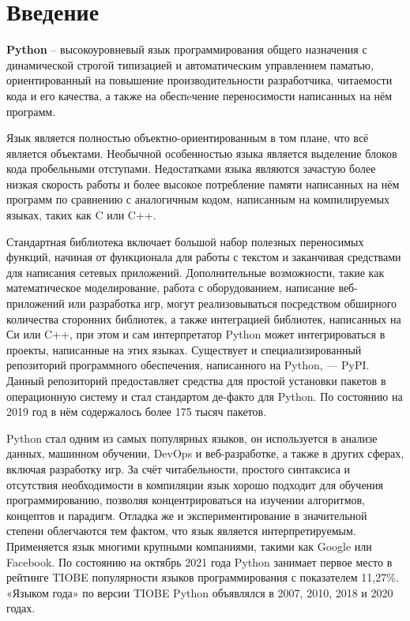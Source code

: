 \section{Введение}

\textbf{Python} -- высокоуровневый язык программирования общего назначения с динамической строгой типизацией и автоматическим управлением паматью, ориентированный на повышение производительности разработчика, читаемости кода и его качества, а также на обеспeчение переносимости написанных на нём программ.

Язык является полностью объектно-ориентированным в том плане, что всё является объектами. Необычной особенностью языка является выделение блоков кода пробельными отступами.
Недостатками языка являются зачастую более низкая скорость работы и более высокое потребление памяти написанных на нём программ по сравнению с аналогичным кодом, написанным на компилируемых языках, таких как C или C++.

Стандартная библиотека включает большой набор полезных переносимых функций, начиная от функционала для работы с текстом и заканчивая средствами для написания сетевых приложений. Дополнительные возможности, такие как математическое моделирование, работа с оборудованием, написание веб-приложений или разработка игр, могут реализовываться посредством обширного количества сторонних библиотек, а также интеграцией библиотек, написанных на Си или C++, при этом и сам интерпретатор Python может интегрироваться в проекты, написанные на этих языках. Существует и специализированный репозиторий программного обеспечения, написанного на Python, — PyPI. Данный репозиторий предоставляет средства для простой установки пакетов в операционную систему и стал стандартом де-факто для Python. По состоянию на 2019 год в нём содержалось более 175 тысяч пакетов.

Python стал одним из самых популярных языков, он используется в анализе данных, машинном обучении, DevOps и веб-разработке, а также в других сферах, включая разработку игр. За счёт читабельности, простого синтаксиса и отсутствия необходимости в компиляции язык хорошо подходит для обучения программированию, позволяя концентрироваться на изучении алгоритмов, концептов и парадигм. Отладка же и экспериментирование в значительной степени облегчаются тем фактом, что язык является интерпретируемым. Применяется язык многими крупными компаниями, такими как Google или Facebook. По состоянию на октябрь 2021 года Python занимает первое место в рейтинге TIOBE популярности языков программирования с показателем 11,27\%. «Языком года» по версии TIOBE Python объявлялся в 2007, 2010, 2018 и 2020 годах.

